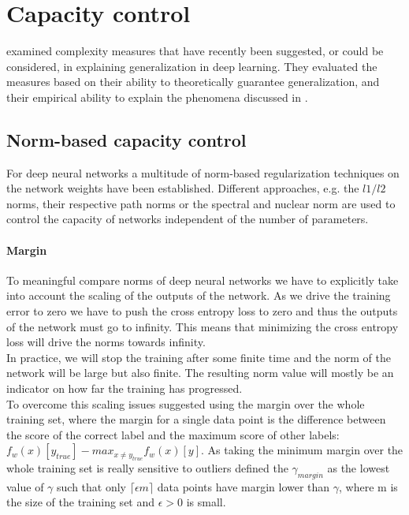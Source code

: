 
\section{Capacity control}
\ns{} examined complexity measures that have recently been suggested, or could be considered, in explaining generalization in deep learning. They evaluated the measures based on their ability to theoretically guarantee generalization, and their empirical ability to explain the phenomena discussed in . 
%
\subsection{Norm-based capacity control}
For deep neural networks a multitude of norm-based regularization techniques on the network weights have been established. Different approaches, e.g. the $l1/l2$ norms, their respective path norms \cite{DBLP:journals/corr/NeyshaburSS15} or the spectral and nuclear norm are used to control the capacity of networks independent of the number of parameters.
%
\paragraph{Margin}
To meaningful compare norms of deep neural networks we have to explicitly take into account the scaling of the outputs of the network. As we drive the training error to zero we have to push the cross entropy loss to zero and thus the outputs of the network must go to infinity. This means that minimizing the cross entropy loss will drive the norms towards infinity. \\
In practice, we will stop the training after some finite time and the norm of the network will be large but also finite. The resulting norm value will mostly be an indicator on how far the training has progressed.\\
To overcome this scaling issues \cite{neyshabur2017exploring} suggested using the margin over the whole training set, where the margin for a single data point is the difference between the score of the correct label and the maximum score of other labels: $f_w(x)[y_{true}] - max_{x \neq y_{true}}f_w(x)[y]$. As taking the minimum margin over the whole training set is really sensitive to outliers \cite{neyshabur2017exploring} defined the $\gamma_{margin}$ as the lowest value of $\gamma$ such that only $\lceil\epsilon m\rceil$ data points have margin lower than $\gamma$, where m is the size of the training set and $\epsilon > 0$ is small.
%
